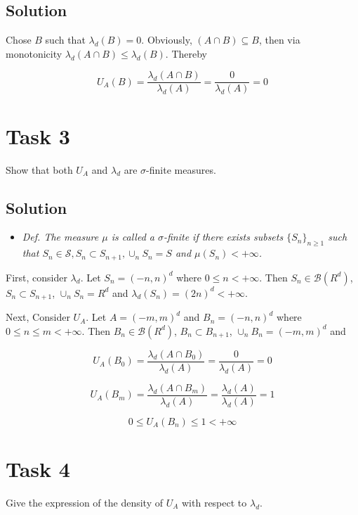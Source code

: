 \documentclass{article}
\begin{document}
\subsection*{Solution}

Chose $B$ such that $\lambda_d(B) = 0$. Obviously, $(A \cap B) \subseteq B$, then via monotonicity $\lambda_d(A\cap B) \leq \lambda_d(B)$. Thereby

$$U_A(B) = \frac{\lambda_d(A \cap B)}{\lambda_d(A)} = \frac{0}{\lambda_d(A)} = 0$$

\section*{Task 3}

Show that both $U_A$ and $\lambda_d$ are $\sigma$-finite measures.

\subsection*{Solution}

\begin{itemize}
    \item \textit{Def. The measure $\mu$ is called a $\sigma$-finite if there exists subsets $\{S_n\}_{n\geq1}$ such that $S_n \in \mathcal S, S_n \subset S_{n+1}, \cup_n S_n = S$ and $\mu(S_n) < +\infty$.}
\end{itemize}

First, consider $\lambda_d$. Let $S_n = (-n, n)^d$ where $0 \leq n < +\infty$. Then $S_n \in \mathcal B (R^d)$, $S_n \subset S_{n+1}$, $\cup_n S_n = R^d$ and $\lambda_d(S_n) = (2n)^d< +\infty$.

Next, Consider $U_A$. Let $A = (-m, m)^d$ and $B_n = (-n, n)^d$ where $0 \leq n \leq m < +\infty$. Then $B_n \in \mathcal B (R^d)$, $B_n \subset B_{n+1}$, $\cup_n B_n = (-m, m)^d$ and

$$U_A(B_0) = 
\frac{\lambda_d(A \cap B_0)}{\lambda_d(A)} =
\frac{0}{\lambda_d(A)} = 0
$$

$$U_A(B_m) = 
\frac{\lambda_d(A \cap B_m)}{\lambda_d(A)} =
\frac{\lambda_d(A)}{\lambda_d(A)} = 1
$$

$$0 \leq U_A(B_n) \leq 1 < +\infty$$

\section*{Task 4}

Give the expression of the density of $U_A$ with respect to $\lambda_d$.
\end{document}
